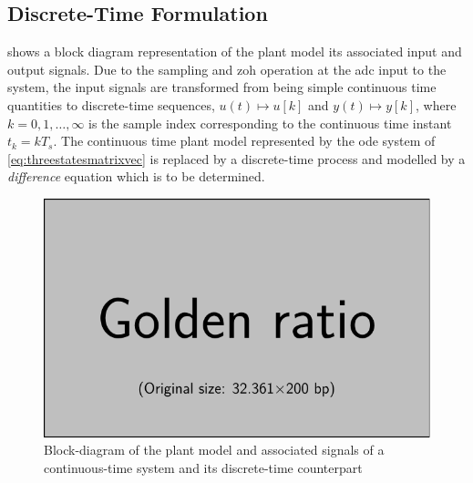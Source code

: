 \subsection{Discrete-Time  Formulation}



 shows  a block  diagram representation of  the plant
model its associated input and output signals. Due to the sampling and \gls{zoh}
operation  at  the  \gls{adc}  input  to  the  system,  the  input  signals  are
transformed  from  being  simple  continuous time  quantities  to  discrete-time
sequences,  \ie{} $u(t)  \mapsto  u[k]$  and $y(t)  \mapsto  y[k]$,  where $k  =
0,1,\dots,∞$ is the sample index  corresponding to the continuous time instant
$t_k  = kT_s$.  The continuous  time plant  model represented  by the  \gls{ode}
system of \cref{eq:threestatesmatrixvec} is replaced  by a discrete-time process
and modelled by a \emph{difference} equation which is to be determined.

\begin{figure}[!htbp]
    \centering
    \includegraphics{placeholder_images/example-image-golden.pdf}
    \caption[Block-diagram of continuous and discrete-time systems]{Block-diagram of the plant model and associated signals of a continuous-time system and its discrete-time counterpart}
    \label{fig:blockdiagctsdisc}
\end{figure}



